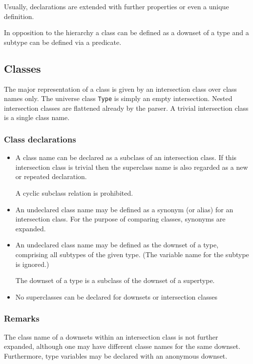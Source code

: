 \documentclass{article}
\begin{document}
Usually, declarations are extended with further properties or even a unique
definition.

In opposition to the hierarchy a class can be defined as a downset of a type
and a subtype can be defined via a predicate.

\subsection{Classes}

The major representation of a class is given by an intersection class over
class names only. The universe class \texttt{Type} is simply an empty
intersection. Nested intersection classes are flattened already by the
parser. A trivial intersection class is a single class name.

\subsubsection*{Class declarations}
\begin{itemize}
\item A class name can be declared as a subclass of an intersection class. If
  this intersection class is trivial then the superclass name is also regarded
  as a new or repeated declaration.
  
  A cyclic subclass relation is prohibited.
\item An undeclared class name may be defined as a synonym (or alias) for an
  intersection class. For the purpose of comparing classes, synonyms are
  expanded.
\item An undeclared class name may be defined as the downset of a type,
  comprising all subtypes of the given type. (The variable name for the
  subtype is ignored.)
  
  The downset of a type is a subclass of the downset of a
  supertype.
\item No superclasses can be declared for downsets or intersection classes

\end{itemize}

\subsubsection*{Remarks}

The class name of a downsets within an intersection class is not further
expanded, although one may have different classe names for the same downset.
Furthermore, type variables may be declared with an anonymous downset.
\end{document}
